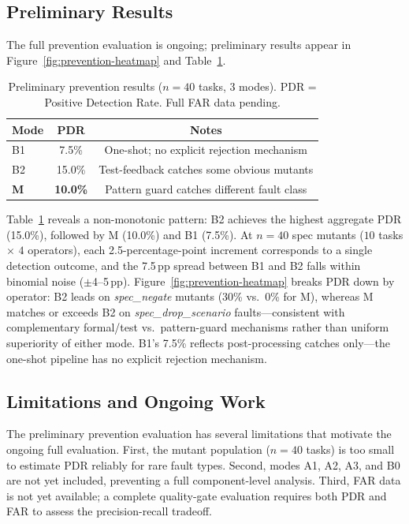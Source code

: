 \subsection{Preliminary Results}

The full prevention evaluation is ongoing; preliminary results appear in
Figure~\ref{fig:prevention-heatmap} and Table~\ref{tab:prevention}.

\begin{table}[H]
  \caption{Preliminary prevention results ($n=40$ tasks, 3 modes). PDR = Positive
    Detection Rate. Full FAR data pending.}
  \label{tab:prevention}
  \centering
  \begin{tabular}{lcc}
    \toprule
    Mode & PDR & Notes \\
    \midrule
    B1 & 7.5\%  & One-shot; no explicit rejection mechanism \\
    B2 & 15.0\% & Test-feedback catches some obvious mutants \\
    \textbf{M}  & \textbf{10.0\%} & Pattern guard catches different fault class \\
    \bottomrule
  \end{tabular}
\end{table}

Table~\ref{tab:prevention} reveals a non-monotonic pattern: B2 achieves the highest
aggregate PDR (15.0\%), followed by M (10.0\%) and B1 (7.5\%).
At $n=40$ spec mutants ($10$ tasks $\times$ $4$ operators), each
2.5-percentage-point increment corresponds to a single detection outcome, and
the 7.5\,pp spread between B1 and B2 falls within binomial noise
($\pm$4--5\,pp).
Figure~\ref{fig:prevention-heatmap} breaks PDR down by operator: B2 leads on
\textit{spec\_negate} mutants (30\% vs.\ 0\% for M), whereas M matches or
exceeds B2 on \textit{spec\_drop\_scenario} faults---consistent with
complementary formal/test vs.\ pattern-guard mechanisms rather than uniform
superiority of either mode.
B1's 7.5\% reflects post-processing catches
only---the one-shot pipeline has no explicit rejection mechanism.

\subsection{Limitations and Ongoing Work}

The preliminary prevention evaluation has several limitations that motivate the
ongoing full evaluation.  First, the mutant population ($n=40$ tasks) is too small
to estimate PDR reliably for rare fault types.  Second, modes A1, A2, A3, and B0
are not yet included, preventing a full component-level analysis.  Third, FAR data
is not yet available; a complete quality-gate evaluation requires both PDR and FAR
to assess the precision-recall tradeoff.

